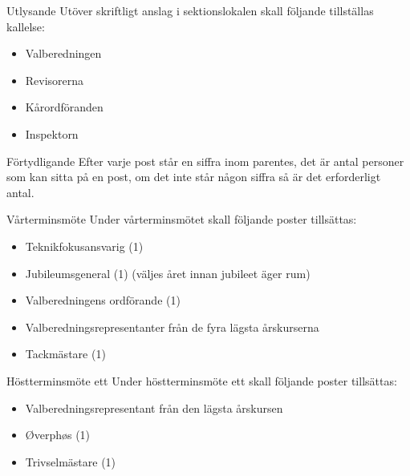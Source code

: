 \documentclass[pdfbookmarks,a4paper,11pt]{article}
\newlength{\itemcollength}
\newenvironment{reglemlista}{%
  \begin{list}{}{%
      \setlength{\labelwidth}{\itemcollength}%
      \setlength{\leftmargin}{\labelwidth + \labelsep}%
      \renewcommand{\makelabel}[1]{%
        \raisebox{0pt}[1ex][0pt]{%
          \makebox[\labelwidth][l]{%
            \parbox[t]{\itemcollength}{%
              \raggedright\hspace{0pt}##1}}}\hfill}%
      }}{%
  \end{list}}
\begin{document}
\begin{reglemlista}

	\item[Utlysande]
	Utöver skriftligt anslag i sektionslokalen skall följande tillställas kallelse:
	\begin{itemize}
		\item Valberedningen
		\item Revisorerna
		\item Kårordföranden
		\item Inspektorn
	\end{itemize}
	
	\item[Förtydligande]
	Efter varje post står en siffra inom parentes, det är antal personer som kan sitta på en post, om det inte står någon siffra så är det erforderligt antal.

	\item[Vårterminsmöte]
	Under vårterminsmötet skall följande poster tillsättas:
	\begin{itemize}

		\item Teknikfokusansvarig (1)
		\item Jubileumsgeneral (1) (väljes året innan jubileet äger rum)
		\item Valberedningens ordförande (1)
		\item Valberedningsrepresentanter från de fyra lägsta årskurserna
		\item Tackmästare (1)
	\end{itemize}

	\item[Höstterminsmöte ett]
	Under höstterminsmöte ett skall följande poster tillsättas:
	\begin{itemize}
		\item Valberedningsrepresentant från den lägsta årskursen
		\item Øverphøs (1)
		\item Trivselmästare (1)
	\end{itemize}


\end{reglemlista}
\end{document}
